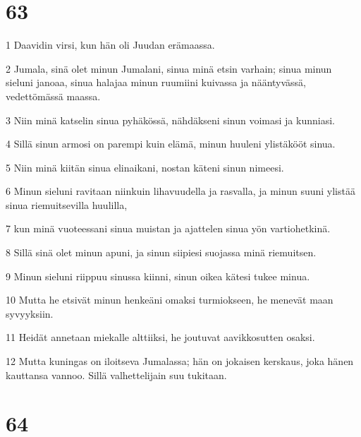 \chapter{63}

\par 1 Daavidin virsi, kun hän oli Juudan erämaassa.
\par 2 Jumala, sinä olet minun Jumalani, sinua minä etsin varhain; sinua minun sieluni janoaa, sinua halajaa minun ruumiini kuivassa ja nääntyvässä, vedettömässä maassa.
\par 3 Niin minä katselin sinua pyhäkössä, nähdäkseni sinun voimasi ja kunniasi.
\par 4 Sillä sinun armosi on parempi kuin elämä, minun huuleni ylistäkööt sinua.
\par 5 Niin minä kiitän sinua elinaikani, nostan käteni sinun nimeesi.
\par 6 Minun sieluni ravitaan niinkuin lihavuudella ja rasvalla, ja minun suuni ylistää sinua riemuitsevilla huulilla,
\par 7 kun minä vuoteessani sinua muistan ja ajattelen sinua yön vartiohetkinä.
\par 8 Sillä sinä olet minun apuni, ja sinun siipiesi suojassa minä riemuitsen.
\par 9 Minun sieluni riippuu sinussa kiinni, sinun oikea kätesi tukee minua.
\par 10 Mutta he etsivät minun henkeäni omaksi turmiokseen, he menevät maan syvyyksiin.
\par 11 Heidät annetaan miekalle alttiiksi, he joutuvat aavikkosutten osaksi.
\par 12 Mutta kuningas on iloitseva Jumalassa; hän on jokaisen kerskaus, joka hänen kauttansa vannoo. Sillä valhettelijain suu tukitaan.

\chapter{64}

